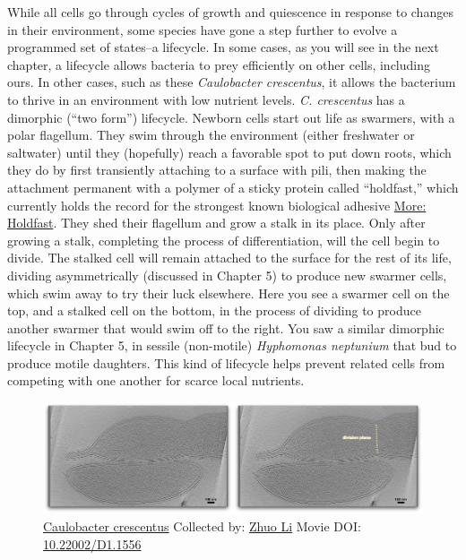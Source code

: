 \documentclass[]{tufte-book}
\begin{document}
While all cells go through cycles of growth and quiescence in response
to changes in their environment, some species have gone a step further
to evolve a programmed set of states--a lifecycle. In some cases, as you
will see in the next chapter, a lifecycle allows bacteria to prey
efficiently on other cells, including ours. In other cases, such as
these \emph{Caulobacter crescentus}, it allows the bacterium to thrive
in an environment with low nutrient levels. \emph{C. crescentus} has a
dimorphic (``two form'') lifecycle. Newborn cells start out life as
swarmers, with a polar flagellum. They swim through the environment
(either freshwater or saltwater) until they (hopefully) reach a
favorable spot to put down roots, which they do by first transiently
attaching to a surface with pili, then making the attachment permanent
with a polymer of a sticky protein called ``holdfast,'' which currently
holds the record for the strongest known biological adhesive
\protect\hyperlink{Holdfast}{More: Holdfast}. They shed their flagellum
and grow a stalk in its place. Only after growing a stalk, completing
the process of differentiation, will the cell begin to divide. The
stalked cell will remain attached to the surface for the rest of its
life, dividing asymmetrically (discussed in Chapter 5) to produce new
swarmer cells, which swim away to try their luck elsewhere. Here you see
a swarmer cell on the top, and a stalked cell on the bottom, in the
process of dividing to produce another swarmer that would swim off to
the right. You saw a similar dimorphic lifecycle in Chapter 5, in
sessile (non-motile) \emph{Hyphomonas neptunium} that bud to produce
motile daughters. This kind of lifecycle helps prevent related cells
from competing with one another for scarce local nutrients.





\begin{figure}
\includegraphics{movie_stills/8_4} \caption[\protect\hyperlink{tree}{Caulobacter crescentus} Collected by:
\protect\hyperlink{zhuo_li}{Zhuo Li} Movie DOI:
\href{https://doi.org/10.22002/D1.1556}{10.22002/D1.1556}]{\protect\hyperlink{tree}{Caulobacter crescentus} Collected by:
\protect\hyperlink{zhuo_li}{Zhuo Li} Movie DOI:
\href{https://doi.org/10.22002/D1.1556}{10.22002/D1.1556}}\label{fig:8-4}
\end{figure}
\end{document}
